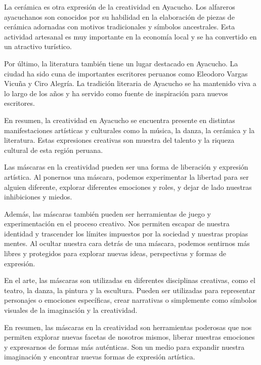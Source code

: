 \documentclass[12pt,a4paper]{article}
\begin{document}
La cerámica es otra expresión de la creatividad en Ayacucho. Los alfareros ayacuchanos son conocidos por su habilidad en la elaboración de piezas de cerámica adornadas con motivos tradicionales y símbolos ancestrales. Esta actividad artesanal es muy importante en la economía local y se ha convertido en un atractivo turístico.

Por último, la literatura también tiene un lugar destacado en Ayacucho. La ciudad ha sido cuna de importantes escritores peruanos como Eleodoro Vargas Vicuña y Ciro Alegría. La tradición literaria de Ayacucho se ha mantenido viva a lo largo de los años y ha servido como fuente de inspiración para nuevos escritores.

En resumen, la creatividad en Ayacucho se encuentra presente en distintas manifestaciones artísticas y culturales como la música, la danza, la cerámica y la literatura. Estas expresiones creativas son muestra del talento y la riqueza cultural de esta región peruana.

Las máscaras en la creatividad pueden ser una forma de liberación y expresión artística. Al ponernos una máscara, podemos experimentar la libertad para ser alguien diferente, explorar diferentes emociones y roles, y dejar de lado nuestras inhibiciones y miedos.

Además, las máscaras también pueden ser herramientas de juego y experimentación en el proceso creativo. Nos permiten escapar de nuestra identidad y trascender los límites impuestos por la sociedad y nuestras propias mentes. Al ocultar nuestra cara detrás de una máscara, podemos sentirnos más libres y protegidos para explorar nuevas ideas, perspectivas y formas de expresión.

En el arte, las máscaras son utilizadas en diferentes disciplinas creativas, como el teatro, la danza, la pintura y la escultura. Pueden ser utilizadas para representar personajes o emociones específicas, crear narrativas o simplemente como símbolos visuales de la imaginación y la creatividad.

En resumen, las máscaras en la creatividad son herramientas poderosas que nos permiten explorar nuevas facetas de nosotros mismos, liberar nuestras emociones y expresarnos de formas más auténticas. Son un medio para expandir nuestra imaginación y encontrar nuevas formas de expresión artística.
\end{document}
